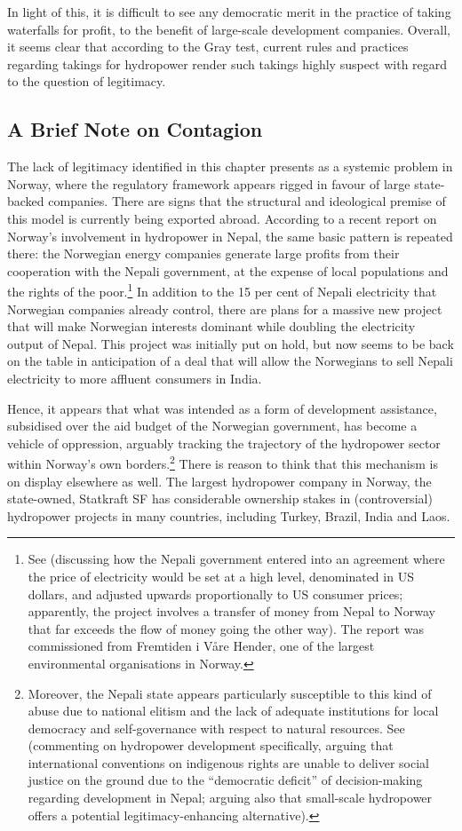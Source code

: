 In light of this, it is difficult to see any democratic merit in the practice of taking waterfalls for profit, to the benefit of large-scale development companies. Overall, it seems clear that according to the Gray test, current rules and practices regarding takings for hydropower render such takings highly suspect with regard to the question of legitimacy.

\subsection{A Brief Note on Contagion}

The lack of legitimacy identified in this chapter presents as a systemic problem in Norway, where the  regulatory framework appears rigged in favour of large state-backed companies. There are signs that the structural and ideological premise of this model is currently being exported abroad. According to a recent report on Norway's involvement in hydropower in Nepal, the same basic pattern is repeated there: the Norwegian energy companies generate large profits from their cooperation with the Nepali government, at the expense of local populations and the rights of the poor.\footnote{See \cite{gaarder15} (discussing how the Nepali government entered into an agreement where the price of electricity would be set at a high level, denominated in US dollars, and adjusted upwards proportionally to US consumer prices; apparently, the project involves a transfer of money from Nepal to Norway that far exceeds the flow of money going the other way). The report was commissioned from Fremtiden i Våre Hender, one of the largest environmental organisations in Norway.} In addition to the 15 per cent of Nepali electricity that Norwegian companies already control, there are plans for a massive new project that will make Norwegian interests dominant while doubling the electricity output of Nepal. This project was initially put on hold, but now seems to be back on the table in anticipation of a deal that will allow the Norwegians to sell Nepali electricity to more affluent consumers in India.

Hence, it appears that what was intended as a form of development assistance, subsidised over the aid budget of the Norwegian government, has become a vehicle of oppression, arguably tracking the trajectory of the hydropower sector within Norway's own borders.\footnote{Moreover, the Nepali state appears particularly susceptible to this kind of abuse due to national elitism and the lack of adequate institutions for local democracy and self-governance with respect to natural resources. See \cite[644]{peris12} (commenting on hydropower development specifically, arguing that international conventions on indigenous rights are unable to deliver social justice on the ground due to the ``democratic deficit'' of decision-making regarding development in Nepal; arguing also that small-scale hydropower offers a potential legitimacy-enhancing alternative).} There is reason to think that this mechanism is on display elsewhere as well. The largest hydropower company in Norway, the state-owned, Statkraft SF has considerable ownership stakes in (controversial) hydropower projects in many countries, including Turkey, Brazil, India and Laos.

